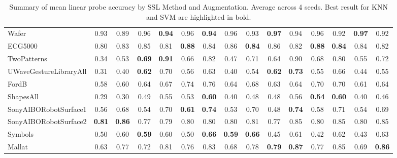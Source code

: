 \documentclass[../../thesis.tex]{subfiles}
\begin{document}
\begin{table}[h]
\begin{adjustbox}{width=\textwidth}
\begin{tabular}{lcc|cc|cc|cc|cc|cc|cc}
        Wafer                   & 0.93 & 0.89 & 0.96 & \textbf{0.94} & 0.96 & \textbf{0.94} & 0.96 & 0.93 & \textbf{0.97} & 0.94 & 0.96 & 0.92 & \textbf{0.97} & 0.92 \\
        ECG5000                 & 0.80 & 0.83 & 0.85 & 0.81 & \textbf{0.88} & 0.84 & 0.86 & \textbf{0.84} & 0.86 & 0.82 & \textbf{0.88} & \textbf{0.84} & 0.84 & 0.82 \\
        TwoPatterns             & 0.34 & 0.53 & \textbf{0.69} &\textbf{ 0.91} & 0.66 & 0.82 & 0.47 & 0.71 & 0.64 & 0.90 & 0.68 & 0.80 & 0.55 & 0.72 \\
        UWaveGestureLibraryAll  & 0.31 & 0.40 & \textbf{0.62} & 0.70 & 0.56 & 0.63 & 0.40 & 0.54 & \textbf{0.62} & \textbf{0.73} & 0.55 & 0.66 & 0.44 & 0.55 \\
        FordB                   & 0.58 & 0.60 & 0.64 & 0.67 & 0.74 & 0.76 & 0.64 & 0.68 & 0.63 & 0.64 & 0.70 & 0.70 & 0.61 & 0.64\\
        ShapesAll               & 0.29 & 0.30 & 0.49 & 0.55 & 0.53 & \textbf{0.60} & 0.40 & 0.48 & 0.48 & 0.56 &\textbf{ 0.54} & \textbf{0.60} & 0.40 & 0.46 \\
        SonyAIBORobotSurface1   & 0.56 & 0.68 & 0.54 & 0.70 & \textbf{0.61} & \textbf{0.74} & 0.53 & 0.70 & 0.48 & \textbf{0.74} & 0.58 & 0.71 & 0.54 & 0.69 \\
        SonyAIBORobotSurface2   & \textbf{0.81} & \textbf{0.86} & 0.77 & 0.79 & 0.80 & 0.80 & 0.80 & 0.81 & 0.77 & 0.85 & 0.80 & 0.85 & 0.80 & 0.85  \\
        Symbols                 & 0.50 & 0.60 & \textbf{0.59} & 0.60 & 0.50 & \textbf{0.66} & \textbf{0.59} & \textbf{0.66} & 0.45 & 0.61 & 0.42 & 0.62 & 0.43 & 0.63 \\
        Mallat                  & 0.63 & 0.77 & 0.72 & 0.81 & 0.76 & 0.83 & 0.68 & 0.78 & \textbf{0.79} & \textbf{0.87} & 0.77 & 0.85 & 0.69 & \textbf{0.86} \\
        \bottomrule
    \end{tabular}
    \end{adjustbox}
    
    \caption{Summary of mean linear probe accuracy by SSL Method and Augmentation. Average across 4 seeds. Best result for KNN and SVM are highlighted in bold.}
    \label{tab:mean_probe}
\end{table}
\end{document}
